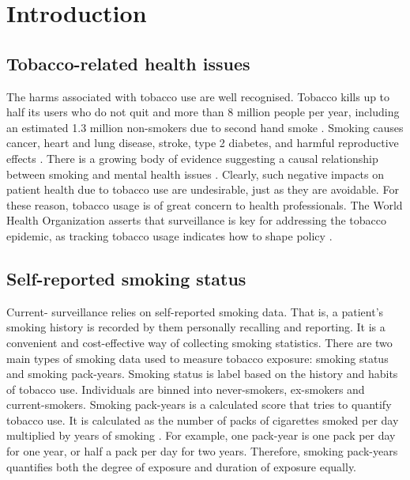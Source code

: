 \documentclass{article}
\begin{document}
\listoffigures
\listofequations
\listoftables

\newpage
{}

\section{Introduction}
\subsection{Tobacco-related health issues}
The harms associated with tobacco use are well recognised. Tobacco kills up to half its users who do not quit and more than 8 million people per year, including an estimated 1.3 million non-smokers due to second hand smoke \cite{who_tobacco}. Smoking causes cancer, heart and lung disease, stroke, type 2 diabetes, and harmful reproductive effects \cite{hhs_smoking_2014}. There is a growing body of evidence suggesting a causal relationship between smoking and mental health issues \cite{taylor2019smoking}. Clearly, such negative impacts on patient health due to tobacco use are undesirable, just as they are avoidable. For these reason, tobacco usage is of great concern to health professionals. The World Health Organization asserts that surveillance is key for addressing the tobacco epidemic, as tracking tobacco usage indicates how to shape policy \cite{who_tobacco}.

\subsection{Self-reported smoking status} \label{sec:srss}
Current- surveillance relies on self-reported smoking data. That is, a patient's smoking history is recorded by them personally recalling and reporting. It is a convenient and cost-effective way of collecting smoking statistics. There are two main types of smoking data used to measure tobacco exposure: smoking status and smoking pack-years. Smoking status is label based on the history and habits of tobacco use. Individuals are binned into never-smokers, ex-smokers and current-smokers. Smoking pack-years is a calculated score that tries to quantify tobacco use. It is calculated as the number of packs of cigarettes smoked per day multiplied by years of smoking \cite{smokingpackyears}. For example, one pack-year is one pack per day for one year, or half a pack per day for two years. Therefore, smoking pack-years quantifies both the degree of exposure and duration of exposure equally.
\end{document}
